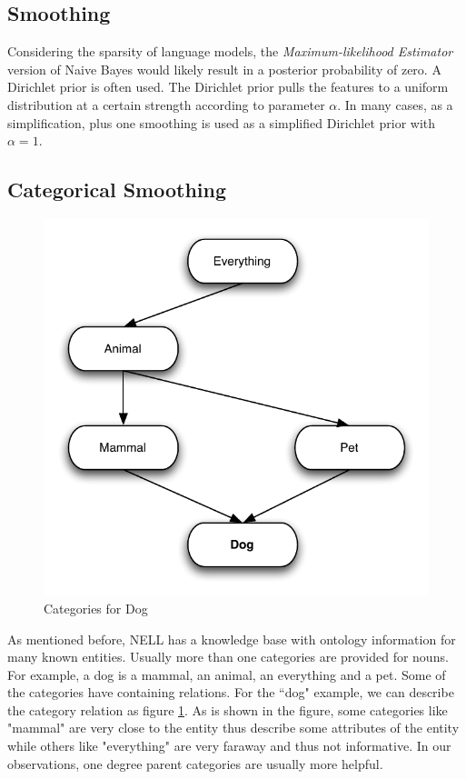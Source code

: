 \subsection{Smoothing}

Considering the sparsity of language models, the \emph{Maximum-likelihood Estimator} version of Naive Bayes would likely result in a posterior probability of zero. A Dirichlet prior is often used. The Dirichlet prior pulls the features to a uniform distribution at a certain strength according to parameter $\alpha$. In many cases, as a simplification, plus one smoothing is used as a simplified Dirichlet prior with $\alpha=1$.

\subsection{Categorical Smoothing}

\begin{figure}[ht]
\vskip 0.2in
\begin{center}
\centerline{\includegraphics[width=\columnwidth]{dog}}
\caption{Categories for Dog}
\label{fig-dog-category-example}
\end{center}
\vskip -0.2in
\end{figure}

As mentioned before, NELL has a knowledge base with ontology information for many known entities. Usually more than one categories are provided for nouns. For example, a dog is a mammal, an animal, an everything and a pet. Some of the categories have containing relations. For the ``dog" example, we can describe the category relation as figure \ref{fig-dog-category-example}. As is shown in the figure, some categories like "mammal" are very close to the entity thus describe some attributes of the entity while others like "everything" are very faraway and thus not informative. In our observations, one degree parent categories are usually more helpful.

